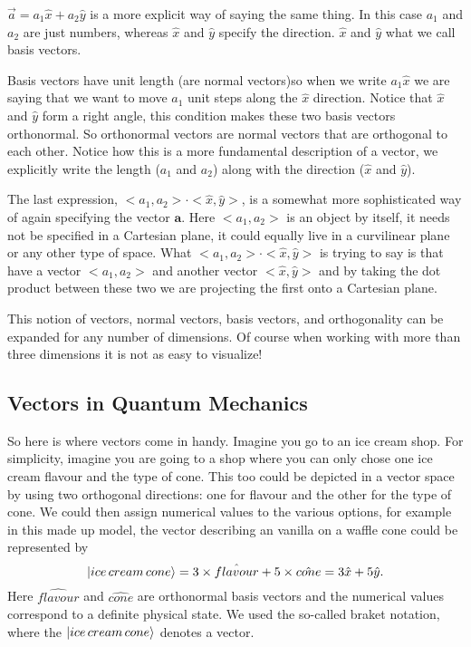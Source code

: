 \documentclass[a4paper]{article}
\begin{document}
$\vec{a} = a_1 \hat{x} + a_2 \hat{y}$ is a more explicit way of saying the same thing. In this case $a_1$ and $a_2$ are just numbers, whereas $\hat{x}$ and $\hat{y}$ specify the direction.
$\hat{x}$ and $\hat{y}$ what we call basis vectors. 

Basis vectors have unit length (are normal vectors)so when we write $a_1 \hat{x}$ we are saying that we want to move $a_1$ unit steps along the $\hat{x}$ direction.
Notice that $\hat{x}$ and $\hat{y}$ form a right angle, this condition makes these two basis vectors orthonormal.
So orthonormal vectors are normal vectors that are orthogonal to each other.
Notice how this is a more fundamental description of a vector, we explicitly write the length ($a_1$ and $a_2$) along with the direction ($\hat{x}$ and $\hat{y}$).

The last expression, $ < a_1, a_2 > \cdot < \hat{x} , \hat{y} > $, is a somewhat more sophisticated way of again specifying the vector $\boldsymbol{a}$. 
Here $ < a_1, a_2 >$ is an object by itself, it needs not be specified in a Cartesian plane, it could equally live in a curvilinear plane or any other type of space.
What $ < a_1, a_2 > \cdot < \hat{x} , \hat{y} > $ is trying to say is that have a vector $ < a_1, a_2 >$ and another vector $ < \hat{x} , \hat{y} > $ and by taking the dot product between these two we are projecting the first onto a Cartesian plane.

This notion of vectors, normal vectors, basis vectors, and orthogonality can be expanded for any number of dimensions. 
Of course when working with more than three dimensions it is not as easy to visualize!

\subsection{Vectors in Quantum Mechanics}
So here is where vectors come in handy.
Imagine you go to an ice cream shop. 
For simplicity, imagine you are going to a shop where you can only chose one ice cream flavour and the type of cone.
This too could be depicted in a vector space by using two orthogonal directions: one for flavour and the other for the type of cone. 
We could then assign numerical values to the various options, for example in this made up model, the vector describing an vanilla on a waffle cone could be represented by 
$$
\ket{ice \, cream \, cone} = 3\times\hat{flavour} + 5\times \hat{cone} = 3 \hat{x} + 5 \hat{y}.
$$
Here $\hat{flavour}$ and $\hat{cone}$ are orthonormal basis vectors and the numerical values correspond to a definite physical state. 
We used the so-called braket notation, where the $\ket{ice \, cream \, cone}$ denotes a vector.
\end{document}
